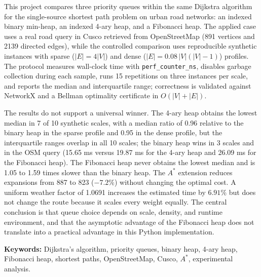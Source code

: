 This project compares three priority queues within the same Dijkstra algorithm for the single-source shortest path problem on urban road networks: an indexed binary min-heap, an indexed 4-ary heap, and a Fibonacci heap. The applied case uses a real road query in Cusco retrieved from OpenStreetMap (891 vertices and 2139 directed edges), while the controlled comparison uses reproducible synthetic instances with sparse ($|E|=4|V|$) and dense ($|E|=0.08\,|V|(|V|-1)$) profiles. The protocol measures wall-clock time with \texttt{perf\_counter\_ns}, disables garbage collection during each sample, runs 15 repetitions on three instances per scale, and reports the median and interquartile range; correctness is validated against NetworkX and a Bellman optimality certificate in $O(|V|+|E|)$.

The results do not support a universal winner. The 4-ary heap obtains the lowest median in 7 of 10 synthetic scales, with a median ratio of 0.96 relative to the binary heap in the sparse profile and 0.95 in the dense profile, but the interquartile ranges overlap in all 10 scales; the binary heap wins in 3 scales and in the OSM query (15.65 ms versus 19.87 ms for the 4-ary heap and 26.09 ms for the Fibonacci heap). The Fibonacci heap never obtains the lowest median and is 1.05 to 1.59 times slower than the binary heap. The $A^*$ extension reduces expansions from 887 to 823 ($-7.2\%$) without changing the optimal cost. A uniform weather factor of 1.0691 increases the estimated time by $6.91\%$ but does not change the route because it scales every weight equally. The central conclusion is that queue choice depends on scale, density, and runtime environment, and that the asymptotic advantage of the Fibonacci heap does not translate into a practical advantage in this Python implementation.

\vspace{0.4cm}
\noindent\textbf{Keywords:} Dijkstra's algorithm, priority queues, binary heap, 4-ary heap, Fibonacci heap, shortest paths, OpenStreetMap, Cusco, $A^*$, experimental analysis.
